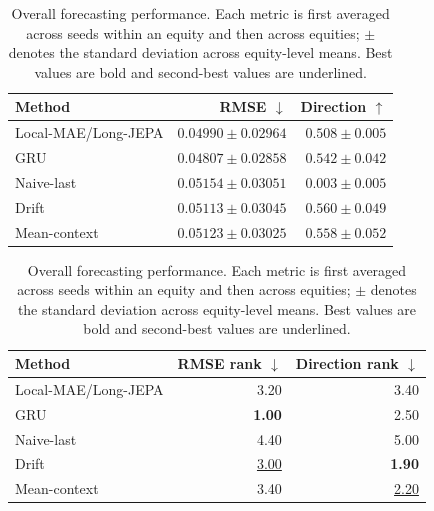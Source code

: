 \begin{table}[t]
\centering
\small
\caption{Overall forecasting performance. Each metric is first averaged across seeds within an equity and then across equities; $\pm$ denotes the standard deviation across equity-level means. Best values are bold and second-best values are underlined.}
\label{tab:main_metrics}
\begin{tabular}{lrr}
\toprule
Method & RMSE $\downarrow$ & Direction $\uparrow$ \\
\midrule
Local-MAE/Long-JEPA & \underline{$0.04990 \pm 0.02964$} & $0.508 \pm 0.005$ \\
GRU & \textbf{$0.04807 \pm 0.02858$} & $0.542 \pm 0.042$ \\
Naive-last & $0.05154 \pm 0.03051$ & $0.003 \pm 0.005$ \\
Drift & $0.05113 \pm 0.03045$ & \textbf{$0.560 \pm 0.049$} \\
Mean-context & $0.05123 \pm 0.03025$ & \underline{$0.558 \pm 0.052$} \\
\bottomrule
\end{tabular}
\par\medskip
\begin{tabular}{lrr}
\toprule
Method & RMSE rank $\downarrow$ & Direction rank $\downarrow$ \\
\midrule
Local-MAE/Long-JEPA & 3.20 & 3.40 \\
GRU & \textbf{1.00} & 2.50 \\
Naive-last & 4.40 & 5.00 \\
Drift & \underline{3.00} & \textbf{1.90} \\
Mean-context & 3.40 & \underline{2.20} \\
\bottomrule
\end{tabular}
\end{table}
